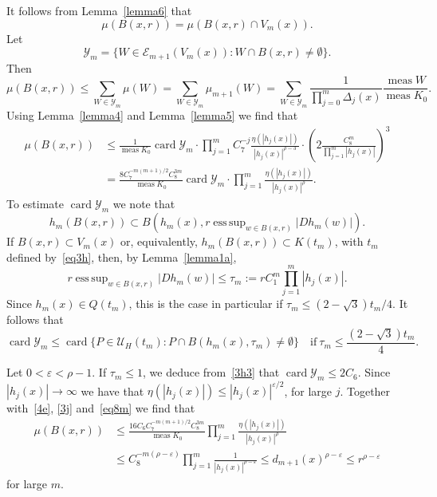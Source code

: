 \documentclass[12pt,a4paper]{amsart}
\theoremstyle{plain}
\theoremstyle{definition}
\theoremstyle{remark}
\DeclareMathOperator*{\esssup}{ess\,sup}
\def\cE{\mathcal E}
\def\cU{\mathcal U}
\def\cY{\mathcal Y}
\def\meas{\operatorname{meas}}
\def\card{\operatorname{card}}
\numberwithin{equation}{section}
\begin{document}
It follows from Lemma~\ref{lemma6} that
\begin{equation}\label{4b}
\mu(B(x,r))
=\mu(B(x,r)\cap V_m(x)) .
\end{equation}
Let 
\begin{equation}\label{4c}
\cY_m=\{W\in \cE_{m+1}(V_m(x))\colon W\cap B(x,r)\neq\emptyset\}.
\end{equation}
Then 
\begin{equation}\label{4d}
\mu(B(x,r))
\leq \sum_{W\in \cY_m} \mu(W)
= \sum_{W\in \cY_m} \mu_{m+1}(W)
=  \sum_{W\in \cY_m} \frac{1}{\prod_{j=0}^m \Delta_j(x)} \frac{\meas W}{\meas K_0} .
\end{equation}
Using Lemma~\ref{lemma4} and Lemma~\ref{lemma5}
we find that
\begin{equation}\label{4e}
\begin{aligned}
\mu(B(x,r))
&\leq 
\frac{1}{\meas K_0}
\card \cY_m \cdot  
\prod_{j=1}^m C_7^{-j} \frac{\eta(|h_j(x)|)}{|h_j(x)|^{\rho-3}}
\cdot \left( 2 \frac{C_8^m}{\prod_{j=1}^{m}|h_j(x)|}\right)^3
\\ &
= 
\frac{8 C_7^{-m(m+1)/2} C_8^{3m} }{\meas K_0}
\card \cY_m \cdot  
\prod_{j=1}^m\frac{\eta(|h_j(x)|)}{|h_j(x)|^{\rho}} .
\end{aligned}
\end{equation}
To estimate $\card\cY_m$ we note that 
\begin{equation}\label{4i}
h_m(B(x,r))\subset B\!\left(h_m(x), r \esssup_{w\in B(x,r)} |Dh_m(w)|\right).
\end{equation}
If $B(x,r)\subset  V_m(x)$ or, equivalently, $h_m(B(x,r))\subset K(t_m)$, 
with $t_m$ defined by~\eqref{eq3h},
then, by Lemma~\ref{lemma1a},
\begin{equation}\label{4j}
 r \esssup_{w\in B(x,r)} |Dh_m(w)| \leq \tau_m :=r C_1^m\prod_{j=1}^m |h_j(x)|.
\end{equation}
Since $h_m(x)\in Q(t_m)$, this is the case in particular if
$\tau_m\leq (2-\sqrt{3})t_m/4$. It follows that 
\begin{equation}\label{4g1}
\card\cY_m \leq 
\card\{P\in  \cU_H(t_m)\colon P\cap B(h_m(x),\tau_m)\neq\emptyset\}
\quad\text{if}\ \tau_m\leq\frac{(2-\sqrt{3})t_m}{4}.
\end{equation}

Let $0<\varepsilon<\rho-1$.
If $\tau_m\leq 1$, we deduce from~\eqref{3h3} that $\card \cY_m\leq 2C_6$. Since $|h_j(x)|\to\infty$ we have that $\eta(|h_j(x)|)\leq |h_j(x)|^{\varepsilon/2}$, for large $j$.
Together with~\eqref{4e}, \eqref{3j} and~\eqref{eq8m} we find that 
\begin{equation}\label{4g2}
\begin{aligned}
\mu(B(x,r))
&\leq 
\frac{16C_6 C_7^{-m(m+1)/2} C_8^{3m} }{\meas K_0}
\prod_{j=1}^m\frac{\eta(|h_j(x)|)}{|h_j(x)|^{\rho}} 
\\ &
\leq C_8^{-m(\rho-\varepsilon)} \prod_{j=1}^m\frac{1}{|h_j(x)|^{\rho-\varepsilon}} 
\leq d_{m+1}(x)^{\rho-\varepsilon}\leq r^{\rho-\varepsilon}
\end{aligned}
\end{equation}
for large $m$.
\end{document}
